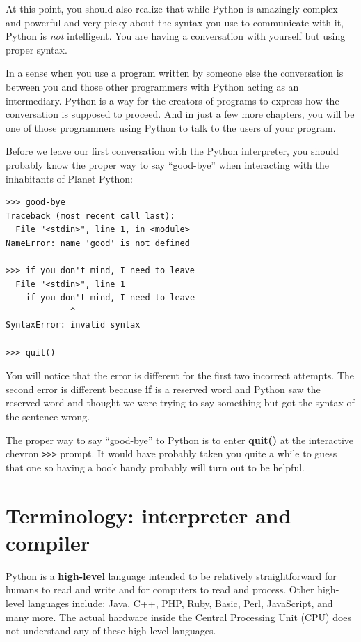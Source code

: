 At this point, you should also realize that while Python 
is amazingly complex and powerful and very picky about 
the syntax you use to communicate with it, Python is {\em 
not} intelligent.  You are having a conversation with 
yourself but using proper syntax.

In a sense when you use a program written by someone else
the conversation is between you and those other
programmers with Python acting as an intermediary.  Python
is a way for the creators of programs to express how the 
conversation is supposed to proceed.  And
in just a few more chapters, you will be one of those
programmers using Python to talk to the users of your program.

Before we leave our first conversation with the Python 
interpreter, you should probably know the proper way
to say ``good-bye'' when interacting with the inhabitants
of Planet Python:

\beforeverb
\begin{verbatim}
>>> good-bye
Traceback (most recent call last):
  File "<stdin>", line 1, in <module>
NameError: name 'good' is not defined

>>> if you don't mind, I need to leave
  File "<stdin>", line 1
    if you don't mind, I need to leave
             ^
SyntaxError: invalid syntax

>>> quit()
\end{verbatim}
\afterverb
%
You will notice that the error is different for the first two
incorrect attempts.   The second error is different because 
{\bf if} is a reserved word and Python saw the reserved word
and thought we were trying to say something but got the syntax
of the sentence wrong.

The proper way to say ``good-bye'' to Python is to enter 
{\bf quit()} at the interactive chevron {\tt >>>} prompt.
It would have probably taken you quite a while to guess that 
one so having a book handy probably will turn out 
to be helpful.

\section{Terminology: interpreter and compiler}

Python is a {\bf high-level} language intended to be relatively
straightforward for humans to read and write and for computers
to read and process.  Other high-level languages include: Java, C++,
PHP, Ruby, Basic, Perl, JavaScript, and many more.  The actual hardware
inside the Central Processing Unit (CPU) does not understand any
of these high level languages.

